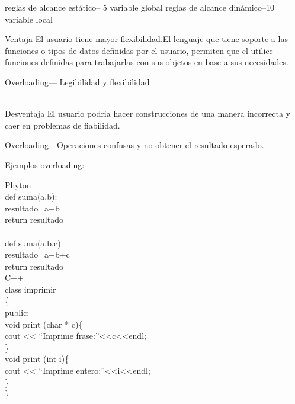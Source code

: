 \documentclass[12pt,oneside]{article}
\begin{document}

reglas de alcance estático-- 5 variable global
reglas de alcance dinámico--10 variable local


Ventaja
El usuario tiene mayor flexibilidad.El lenguaje que tiene soporte a las funciones o tipos de datos definidas por el usuario, permiten que el utilice funciones definidas para trabajarlas con sus objetos en base a sus necesidades.

Overloading--- Legibilidad y flexibilidad

 \\
Desventaja
El usuario podria hacer construcciones de una manera incorrecta y caer en problemas de fiabilidad.

Overloading---Operaciones confusas y no obtener el resultado esperado.

Ejemplos overloading:

Phyton  \\
def suma(a,b):  \\
    resultado=a+b  \\
    return resultado  \\ \\

def suma(a,b,c)  \\
     resultado=a+b+c  \\
     return resultado  \\

C++  \\
class imprimir  \\
\{  \\
public:  \\
void print (char * c)\{  \\
 cout << “Imprime frase:”<<c<<endl;  \\
\}  \\
void print (int i)\{  \\
 cout << “Imprime entero:”<<i<<endl;  \\
 \}  \\
\}  \\



\end{document}

